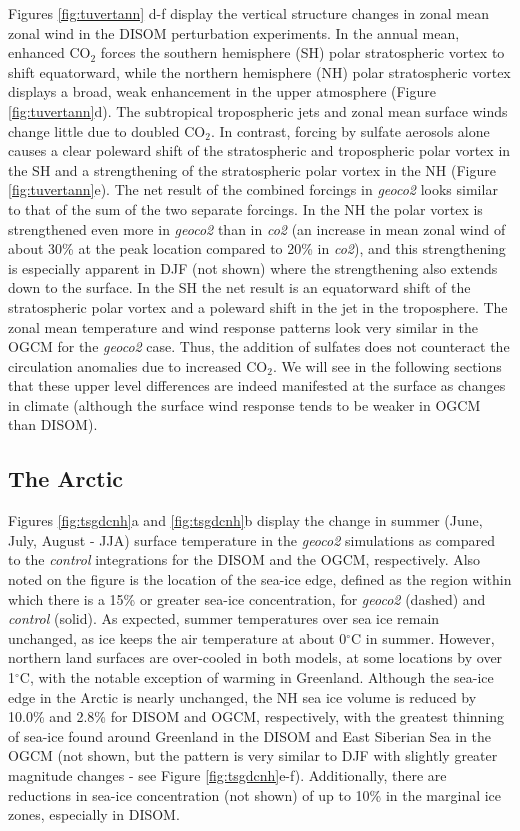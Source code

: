 \documentclass[12pt]{article}
\newcommand{\sectdef}{\subsection} %
\begin{document}
Figures \ref{fig:tuvertann} d-f display the vertical structure changes in zonal mean zonal wind in the DISOM perturbation experiments. In the annual mean, enhanced CO$_2$ forces the southern hemisphere (SH) polar stratospheric vortex to shift equatorward, while the northern hemisphere (NH) polar stratospheric vortex displays a broad, weak enhancement in the upper atmosphere (Figure \ref{fig:tuvertann}d). The subtropical tropospheric jets and zonal mean surface winds change little due to doubled CO$_2$. In contrast, forcing by sulfate aerosols alone causes a clear poleward shift of the stratospheric and tropospheric polar vortex in the SH and a strengthening of the stratospheric polar vortex in the NH (Figure \ref{fig:tuvertann}e). The net result of the combined forcings in \textit{geoco2} looks similar to that of the sum of the two separate forcings. In the NH the polar vortex is strengthened even more in \textit{geoco2} than in \textit{co2} (an increase in mean zonal wind of about 30\% at the peak location compared to 20\% in \textit{co2}), and this strengthening is especially apparent in DJF (not shown) where the strengthening also extends down to the surface. In the SH the net result is an equatorward shift of the stratospheric polar vortex and a poleward shift in the jet in the troposphere. The zonal mean temperature and wind response patterns look very similar in the OGCM for the \textit{geoco2} case. Thus, the addition of sulfates does not counteract the circulation anomalies due to increased CO$_2$. We will see in the following sections that these upper level differences are indeed manifested at the surface as changes in climate (although the surface wind response tends to be weaker in OGCM than DISOM). 

\sectdef{The Arctic}

Figures \ref{fig:tsgdcnh}a and \ref{fig:tsgdcnh}b display the change in summer (June, July, August - JJA) surface temperature in the \textit{geoco2} simulations as compared to the \textit{control} integrations for the DISOM and the OGCM, respectively. Also noted on the figure is the location of the sea-ice edge, defined as the region within which there is a 15\% or greater sea-ice concentration, for \textit{geoco2} (dashed) and \textit{control} (solid). As expected, summer temperatures over sea ice remain unchanged, as ice keeps the air temperature at about 0$^\circ$C in summer. However, northern land surfaces are over-cooled in both models, at some locations by over 1$^\circ$C, with the notable exception of warming in Greenland. Although the sea-ice edge in the Arctic is nearly unchanged, the NH sea ice volume is reduced by 10.0\% and 2.8\% for DISOM and OGCM, respectively, with the greatest thinning of sea-ice found around Greenland in the DISOM and East Siberian Sea in the OGCM (not shown, but the pattern is very similar to DJF  with slightly greater magnitude changes - see Figure \ref{fig:tsgdcnh}e-f). Additionally, there are reductions in sea-ice concentration (not shown) of up to 10\% in the marginal ice zones, especially in DISOM.
\end{document}
